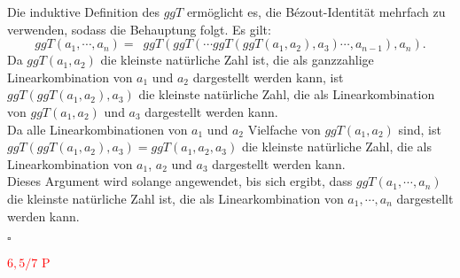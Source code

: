 \documentclass[12pt]{article}
\newcommand{\corr}[1]{\textcolor{red}{#1}}
\newcommand{\QED}{\begin{flushright} $\square$ \end{flushright}}
\begin{document}
Die induktive Definition des $ggT$ ermöglicht es, die Bézout-Identität mehrfach zu verwenden, sodass die Behauptung folgt. Es gilt:
$$ggT(a_1, \cdots, a_n) = \enspace ggT(ggT( \cdots ggT(ggT(a_1, a_2), a_3) \cdots, a_{n-1}), a_n).$$
Da $ggT(a_1, a_2)$ die kleinste natürliche Zahl ist, die als ganzzahlige Linearkombination von $a_1$ und $a_2$ dargestellt werden kann, ist $ggT(ggT(a_1, a_2), a_3)$ die kleinste natürliche Zahl, die als Linearkombination von $ggT(a_1, a_2)$ und $a_3$ dargestellt werden kann. \\
Da alle Linearkombinationen von $a_1$ und $a_2$ Vielfache von $ggT(a_1, a_2)$ sind, ist $ggT(ggT(a_1, a_2), a_3) = ggT(a_1, a_2, a_3)$ die kleinste natürliche Zahl, die als Linearkombination von $a_1$, $a_2$ und $a_3$ dargestellt werden kann. \\
Dieses Argument wird solange angewendet, bis sich ergibt, dass $ggT(a_1, \cdots, a_n)$ die kleinste natürliche Zahl ist, die als Linearkombination von $a_1, \cdots, a_n$ dargestellt werden kann.
\QED
\corr{$6,5/7$ P}
\end{document}
